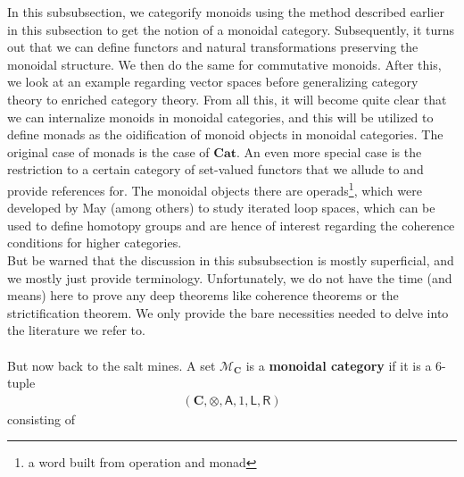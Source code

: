 \nocite{bc53e62a}
In this subsubsection, we categorify monoids using the method described earlier in this subsection to get the notion of a monoidal category.
Subsequently, it turns out that we can define functors and natural transformations preserving the monoidal structure.
We then do the same for commutative monoids.
After this, we look at an example regarding vector spaces before generalizing category theory to enriched category theory.
From all this, it will become quite clear that we can internalize monoids in monoidal categories, and this will be utilized to define monads as the oidification of monoid objects in monoidal categories.
The original case of monads is the case of $\mathbf{Cat}$.
An even more special case is the restriction to a certain category of set-valued functors that we allude to and provide references for.
The monoidal objects there are operads\footnote{a word built from operation and monad}, which were developed by May (among others) to study iterated loop spaces, which can be used to define homotopy groups and are hence of interest regarding the coherence conditions for higher categories.
\\
But be warned that the discussion in this subsubsection is mostly superficial, and we mostly just provide terminology.
Unfortunately, we do not have the time (and means) here to prove any deep theorems like coherence theorems or the strictification theorem.
We only provide the bare necessities needed to delve into the literature we refer to.
\\\\
But now back to the salt mines.
A set $\mathcal{M}_{\mathbf{C}}$ is a \textbf{monoidal category} if it is a $6$-tuple
\begin{align*}
  \left(
    \mathbf{C},
    \otimes,
    \mathsf{A},
    1,
    \mathsf{L},
    \mathsf{R}
  \right)
\end{align*}
consisting of
